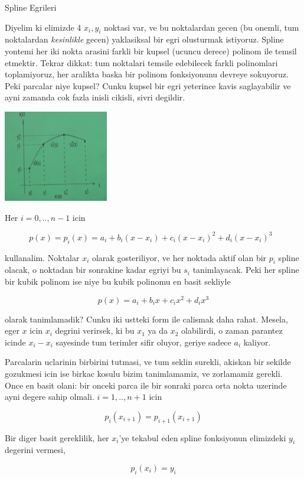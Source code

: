 \documentclass[12pt,fleqn]{article}\usepackage{common}
\begin{document}
Spline Egrileri

Diyelim ki elimizde 4 $x_i,y_i$ noktasi var, ve bu noktalardan gecen (bu
onemli, tum noktalardan {\em kesinlikle} gecen) yaklasiksal bir egri
olusturmak istiyoruz. Spline yontemi her iki nokta arasini farkli bir
kupsel (ucuncu derece) polinom ile temsil etmektir. Tekrar dikkat: tum
noktalari temsile edebilecek farkli polinomlari toplamiyoruz, her aralikta
baska bir polinom fonksiyonunu devreye sokuyoruz. Peki parcalar niye
kupsel? Cunku kupsel bir egri yeterince kavis saglayabilir ve ayni zamanda
cok fazla inisli cikisli, sivri degildir.

\includegraphics[height=4cm]{spline1.png}

Her $i=0,..,n-1$ icin 

\[ p(x) = p_i(x) = a_i + b_i(x-x_i) + c_i(x-x_i)^2 + d_i(x-x_i)^3
\ \ \ \label{1}
\]

kullanalim. Noktalar $x_i$ olarak gosteriliyor, ve her noktada aktif olan
bir $p_i$ spline olacak, o noktadan bir sonrakine kadar egriyi bu $s_i$
tanimlayacak. Peki her spline bir kubik polinom ise niye bu kubik polinomu
en basit sekliyle 

\[ p(x) = a_i + b_ix + c_ix^2 + d_ix^3 \]

olarak tanimlamadik? Cunku iki ustteki form ile calismak daha
rahat. Mesela, eger $x$ icin $x_i$ degrini verirsek, ki bu $x_1$ ya da
$x_2$ olabilirdi, o zaman parantez icinde $x_i - x_i$ sayesinde tum terimler sifir
oluyor, geriye sadece $a_i$ kaliyor. 

Parcalarin uclarinin birbirini tutmasi, ve tum seklin surekli, akiskan bir
sekilde gozukmesi icin ise birkac kosulu bizim tanimlamamiz, ve zorlamamiz
gerekli. Once en basit olani: bir onceki parca ile bir sonraki parca
orta nokta uzerinde ayni degere sahip olmali. $i=1,..,n+1$ icin

\[ p_i (x_{i+1}) = p_{i+1}(x_{i+1}) \]

Bir diger basit gereklilik, her $x_i$'ye tekabul eden spline fonksiyonun
elimizdeki $y_i$ degerini vermesi,

\[ p_i(x_i) = y_i \]
\end{document}
